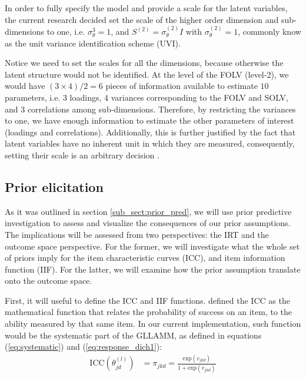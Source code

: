 In order to fully specify the model and provide a scale for the latent variables, the current research decided set the scale of the higher order dimension and sub-dimensions to one, i.e. $\sigma^{3}_{\theta} = 1$, and $S^{(2)} = \sigma^{(2)}_{\theta} I$ with $\sigma^{(2)}_{\theta} = 1$, commonly know as the unit variance identification scheme (UVI). 

Notice we need to set the scales for all the dimensions, because otherwise the latent structure would not be identified. At the level of the FOLV (level-2), we would have $(3 \times 4)/2 = 6$ pieces of information available to estimate $10$ parameters, i.e. $3$ loadings, $4$ variances corresponding to the FOLV and SOLV, and $3$ correlations among sub-dimensions. Therefore, by restricting the variances to one, we have enough information to estimate the other parameters of interest (loadings and correlations). Additionally, this is further justified by the fact that latent variables have no inherent unit in which they are measured, consequently, setting their scale is an arbitrary  decision \cite{Beaujean_2014}.



\subsection{Prior elicitation}

As it was outlined in section \ref{sub_sect:prior_pred}, we will use prior predictive investigation to assess and visualize the consequences of our prior assumptions. The implications will be assessed from two perspectives: the IRT and the outcome space perspective. For the former, we will investigate what the whole set of priors imply for the item characteristic curves (ICC), and item information function (IIF). For the latter, we will examine how the prior assumption translate onto the outcome space.

First, it will useful to define the ICC and IIF functions. \citet{Hambleton_et_al_1991b} defined the ICC as the mathematical function that relates the probability of success on an item, to the ability measured by that same item. In our current implementation, such function would be the systematic part of the GLLAMM, as defined in equations (\ref{eq:systematic}) and (\ref{eq:response_dich1}):
%
\begin{equation} \label{eq:ICC}
	\begin{split}
		\text{ICC} \left( \theta^{(l)}_{jd} \right) & = \pi_{jkd} = \frac{ \text{exp}(v_{jkd}) }{ 1 + \text{exp}(v_{jkd}) }
	\end{split}	
\end{equation}

